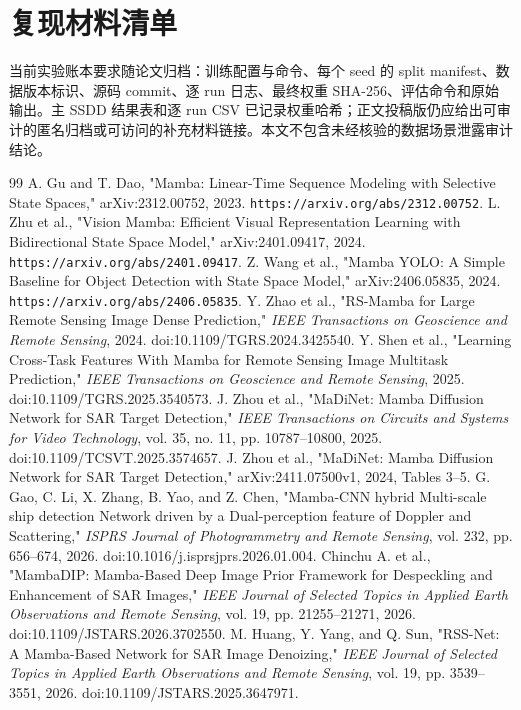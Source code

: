 \documentclass[UTF8,12pt,a4paper]{ctexart}
\begin{document}
\section{复现材料清单}
当前实验账本要求随论文归档：训练配置与命令、每个 seed 的 split manifest、数据版本标识、源码 commit、逐 run 日志、最终权重 SHA-256、评估命令和原始输出。主 SSDD 结果表和逐 run CSV 已记录权重哈希；正文投稿版仍应给出可审计的匿名归档或可访问的补充材料链接。本文不包含未经核验的数据场景泄露审计结论。
{\footnotesize
\setlength{\itemsep}{0pt}
\begin{thebibliography}{99}
A. Gu and T. Dao, "Mamba: Linear-Time Sequence Modeling with Selective State Spaces," arXiv:2312.00752, 2023. \texttt{https://arxiv.org/abs/2312.00752}.
L. Zhu et al., "Vision Mamba: Efficient Visual Representation Learning with Bidirectional State Space Model," arXiv:2401.09417, 2024. \texttt{https://arxiv.org/abs/2401.09417}.
Z. Wang et al., "Mamba YOLO: A Simple Baseline for Object Detection with State Space Model," arXiv:2406.05835, 2024. \texttt{https://arxiv.org/abs/2406.05835}.
Y. Zhao et al., "RS-Mamba for Large Remote Sensing Image Dense Prediction," \emph{IEEE Transactions on Geoscience and Remote Sensing}, 2024. doi:10.1109/TGRS.2024.3425540.
Y. Shen et al., "Learning Cross-Task Features With Mamba for Remote Sensing Image Multitask Prediction," \emph{IEEE Transactions on Geoscience and Remote Sensing}, 2025. doi:10.1109/TGRS.2025.3540573.
J. Zhou et al., "MaDiNet: Mamba Diffusion Network for SAR Target Detection," \emph{IEEE Transactions on Circuits and Systems for Video Technology}, vol. 35, no. 11, pp. 10787--10800, 2025. doi:10.1109/TCSVT.2025.3574657.
J. Zhou et al., "MaDiNet: Mamba Diffusion Network for SAR Target Detection," arXiv:2411.07500v1, 2024, Tables 3--5.
G. Gao, C. Li, X. Zhang, B. Yao, and Z. Chen, "Mamba-CNN hybrid Multi-scale ship detection Network driven by a Dual-perception feature of Doppler and Scattering," \emph{ISPRS Journal of Photogrammetry and Remote Sensing}, vol. 232, pp. 656--674, 2026. doi:10.1016/j.isprsjprs.2026.01.004.
Chinchu A. et al., "MambaDIP: Mamba-Based Deep Image Prior Framework for Despeckling and Enhancement of SAR Images," \emph{IEEE Journal of Selected Topics in Applied Earth Observations and Remote Sensing}, vol. 19, pp. 21255--21271, 2026. doi:10.1109/JSTARS.2026.3702550.
M. Huang, Y. Yang, and Q. Sun, "RSS-Net: A Mamba-Based Network for SAR Image Denoizing," \emph{IEEE Journal of Selected Topics in Applied Earth Observations and Remote Sensing}, vol. 19, pp. 3539--3551, 2026. doi:10.1109/JSTARS.2025.3647971.

\end{thebibliography}}
\end{document}
